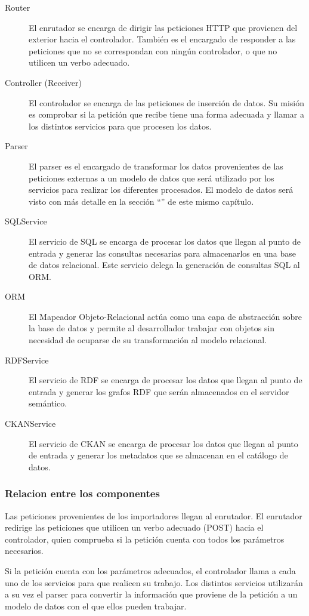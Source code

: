 \begin{description}
	\item[Router]  El enrutador se encarga de dirigir las peticiones HTTP que provienen del exterior hacia el controlador.  También es el encargado de responder a las peticiones que no se correspondan con ningún controlador, o que no utilicen un verbo adecuado.
	\item[Controller (Receiver)]  El controlador se encarga de las peticiones de inserción de datos.  Su misión es comprobar si la petición que recibe tiene una forma adecuada y llamar a los distintos servicios para que procesen los datos.
	\item[Parser]  El parser es el encargado de transformar los datos provenientes de las peticiones externas a un modelo de datos que será utilizado por los servicios para realizar los diferentes procesados.  El modelo de datos será visto con más detalle en la sección ``'' de este mismo capítulo.
	\item[SQLService]  El servicio de SQL se encarga de procesar los datos que llegan al punto de entrada y generar las consultas necesarias para almacenarlos en una base de datos relacional.  Este servicio delega la generación de consultas SQL al ORM.
	\item[ORM]  El Mapeador Objeto-Relacional actúa como una capa de abstracción sobre la base de datos y permite al desarrollador trabajar con objetos sin necesidad de ocuparse de su transformación al modelo relacional.
	\item[RDFService]  El servicio de RDF se encarga de procesar los datos que llegan al punto de entrada y generar los grafos RDF que serán almacenados en el servidor semántico.
	\item[CKANService]  El servicio de CKAN se encarga de procesar los datos que llegan al punto de entrada y generar los metadatos que se almacenan en el catálogo de datos.
\end{description}


\subsubsection{Relacion entre los componentes}
Las peticiones provenientes de los importadores llegan al enrutador.  El enrutador redirige las peticiones que utilicen un verbo adecuado (POST) hacia el controlador, quien comprueba si la petición cuenta con todos los parámetros necesarios.

Si la petición cuenta con los parámetros adecuados, el controlador llama a cada uno de los servicios para que realicen su trabajo.  Los distintos servicios utilizarán a su vez el parser para convertir la información que proviene de la petición a un modelo de datos con el que ellos pueden trabajar.


